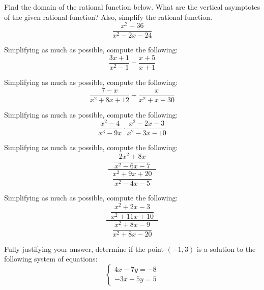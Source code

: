 \documentclass[11pt,letterpaper]{article}
\begin{document}

 Find the domain of the rational function below. What are the vertical asymptotes of the given rational function? Also, simplify the rational function. 
	\[
	\dfrac{x^2 - 36}{x^2 - 2x - 24}
	\]



\newpage



 Simplifying as much as possible, compute the following:
	\[
	\dfrac{3x + 1}{x^2 - 1} - \dfrac{x + 5}{x + 1}
	\]



\newpage



 Simplifying as much as possible, compute the following:
	\[
	\dfrac{7 - x}{x^2 + 8x + 12} + \dfrac{x}{x^2 + x - 30}
	\]



\newpage



 Simplifying as much as possible, compute the following:
	\[
	\dfrac{x^2 - 4}{x^3 - 9x} \cdot \dfrac{x^2 - 2x - 3}{x^2 - 3x - 10}
	\]



\newpage



 Simplifying as much as possible, compute the following:
	\[
	\dfrac{\;\;\dfrac{2x^2 + 8x}{x^2 - 6x - 7}\;\;}{\;\;\dfrac{x^2 + 9x + 20}{x^2 - 4x - 5}\;\;}
	\]



\newpage



 Simplifying as much as possible, compute the following:
	\[
	\dfrac{\;\;\dfrac{x^2 + 2x - 3}{x^2 + 11x + 10}\;\;}{\;\;\dfrac{x^2 + 8x - 9}{x^2 + 8x - 20}\;\;}
	\]



\newpage



 Fully justifying your answer, determine if the point $(-1, 3)$ is a solution to the following system of equations:
	\[
	\begin{cases}
	4x - 7y= -8 \\[0.3cm]
	-3x + 5y= 5
	\end{cases}
	\]
\end{document}
